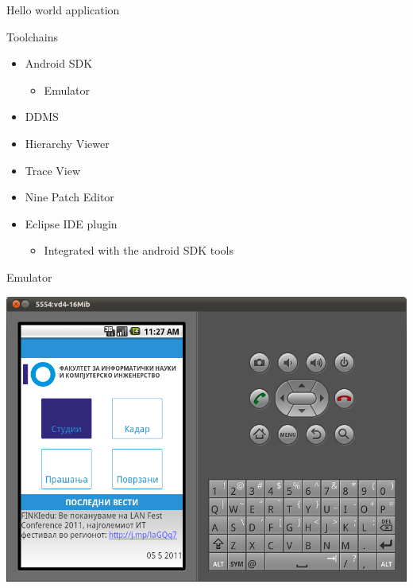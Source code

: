\begin{frame}{Hello world application}

\end{frame}

\begin{frame}{Toolchains}
\begin{itemize}
  \item Android SDK
  \begin{itemize}
  \item Emulator
  \end{itemize}
  \item DDMS
  \item Hierarchy Viewer
  \item Trace View
  \item Nine Patch Editor
  \item Eclipse IDE plugin
  \begin{itemize}
  \item Integrated with the android SDK tools
  \end{itemize}
\end{itemize}
\end{frame}

\begin{frame}{Emulator}
\begin{center}
\includegraphics[scale=0.25]{images/emulator}
\end{center}
\end{frame}

